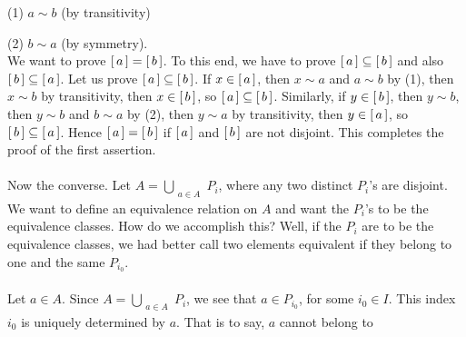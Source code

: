 \documentclass{article}
\begin{document}
   (1)\hspace{6mm}  
   $a\sim b$ \hspace{25mm} (by transitivity)
   
   (2)\hspace{6mm}  
   $b\sim a$  \hspace{25mm} (by symmetry).\\
   
   We want to prove 
   $\left[ \, a \,\right]  = \left[ \, b \,\right] $.
   To this end, we have to prove
   $\left[ \, a \,\right]  \subseteq \left[ \, b \,\right] $ 
   and also 
   $\left[ \, b \,\right]  \subseteq \left[ \, a \,\right] $. 
   Let us prove 
   $\left[ \, a \,\right]  \subseteq \left[ \, b \,\right] $. 
   If 
   $x \in \left[ \, a \,\right] $, 
   then 
   $x \sim a$ and $a \sim b$ 
   by (1), then 
   $x \sim b$
   by transitivity, then 
   $x \in \left[ \, b \,\right] $,
   so 
   $\left[ \, a \,\right]  \subseteq \left[ \, b \,\right] $. 
   Similarly, if 
   $y \in \left[ \, b \,\right] $, then $y \sim b$, 
   then
   $y \sim b$ 
   and
   $b \sim a$ 
   by (2), then 
   $y \sim a$ 
   by transitivity, then 
   $y \in \left[ \, a \,\right] $, 
   so 
   $\left[ \, b \,\right]  \subseteq \left[ \, a \,\right] $. 
   Hence $\left[ \, a \,\right]  = \left[ \, b \,\right] $ 
   if 
   $\left[ \, a \,\right] $ 
   and 
   $\left[ \, b \,\right] $ 
   are not disjoint. This completes the proof of the first assertion.\\
   \\
   Now the converse. Let  
   $A = \bigcup_{
   \substack{ a \in A}
   } P_{i}$, 
   where any two distinct $P_{i}$'s are disjoint. We want to define an equivalence relation on $A$ and want the $P_{i}$'s to be the equivalence classes. How do we accomplish this? Well, if the $P_{i}$ are to be the equivalence classes, we had better call two elements equivalent if they belong to  one and the same $P_{i_{0}}$.\\
   \\
   Let 
   $a \in A$. 
   Since 
   $A = \bigcup_{
   \substack{ a \in A}
   }
   P_{i}$, 
   we see that 
   $a \in P_{i_{0}}$,
   for some 
   $i_{0} \in I$.
   This index $i_{0}$ is uniquely determined by $a$. That is to say, $a$ cannot belong to
   
   
\end{document}
